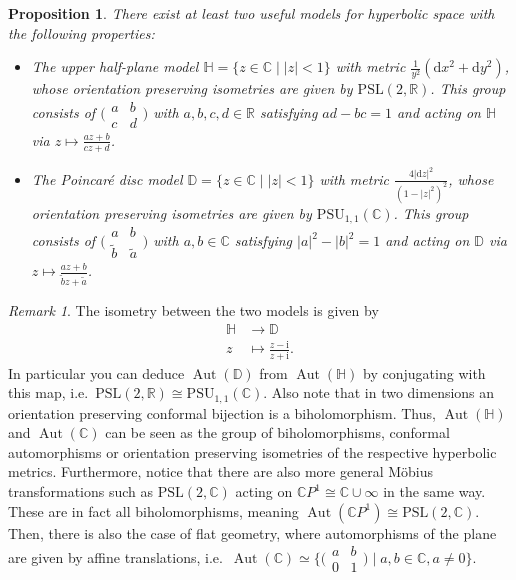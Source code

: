 \documentclass[a4paper]{article}
\newcommand{\RR}{\mathbb{R}}
\newcommand{\CC}{\mathbb{C}}
\newcommand{\HH}{\mathbb{H}}
\newcommand{\DD}{\mathbb{D}}
\newcommand{\dd}{\mathrm{d}}
\newcommand{\ii}{\mathrm{i}}
\newcommand{\lra}{\longrightarrow}
\newcommand{\wt}[1]{\widetilde{#1}}
\newcommand{\Aut}{\operatorname{Aut}}
\newcommand{\PSL}{\mathrm{PSL}}
\newcommand{\PSU}{\mathrm{PSU}}
\newtheorem*{prop}{Proposition}
\theoremstyle{definition}
\theoremstyle{remark}
\newtheorem*{rmk}{Remark}
\theoremstyle{remark}
\begin{document}
\begin{prop}
  There exist at least two useful models for hyperbolic space with the following properties:
  \begin{itemize}
  \item The \emph{upper half-plane model} $\HH=\{z\in\CC\mid|z|<1\}$ with metric $\frac{1}{y^2}(\dd x^2+\dd y^2)$, whose orientation preserving isometries are given by $\PSL(2,\RR)$. This group consists of $\bigl(\begin{smallmatrix} a&b\\ c&d \end{smallmatrix} \bigr)$ with $a,b,c,d\in\RR$ satisfying $ad-bc=1$ and acting on $\HH$ via $z\mapsto\frac{az+b}{cz+d}$.
  \item The \emph{Poincaré disc model} $\DD=\{z\in\CC\mid|z|<1\}$ with metric $\frac{4|\dd z|^2}{(1-|z|^2)^2}$, whose orientation preserving isometries are given by $\PSU_{1,1}(\CC)$. This group consists of $\bigl(\begin{smallmatrix} a&b\\ \wt{b}&\wt{a} \end{smallmatrix} \bigr)$ with $a,b\in\CC$ satisfying $|a|^2-|b|^2=1$ and acting on $\DD$ via $z\mapsto\frac{az+b}{\wt{b}z+\wt{a}}$.
  \end{itemize}
\end{prop}

\begin{rmk}
  The isometry between the two models is given by
  \begin{align*}
    \HH&\lra\DD\\
    z&\longmapsto\frac{z-\ii}{z+\ii}.
  \end{align*}
  In particular you can deduce $\Aut(\DD)$ from $\Aut(\HH)$ by conjugating with this map, i.e.\ $\PSL(2,\RR)\cong\PSU_{1,1}(\CC)$.  Also note that in two dimensions an orientation preserving conformal bijection is a biholomorphism. Thus, $\Aut(\HH)$ and $\Aut(\CC)$ can be seen as the group of biholomorphisms, conformal automorphisms or orientation preserving isometries of the respective hyperbolic metrics. Furthermore, notice that there are also more general Möbius transformations such as $\PSL(2,\CC)$ acting on $\CC P^1\cong \CC\cup\infty$ in the same way. These are in fact all biholomorphisms, meaning $\Aut(\CC P^1)\cong\PSL(2,\CC)$. Then, there is also the case of flat geometry, where automorphisms of the plane are given by affine translations, i.e.\ $\Aut(\CC)\simeq\{\bigl(\begin{smallmatrix} a&b\\ 0&1 \end{smallmatrix} \bigr)\mid a,b\in\CC, a\neq 0\}$.
\end{rmk}
\end{document}
